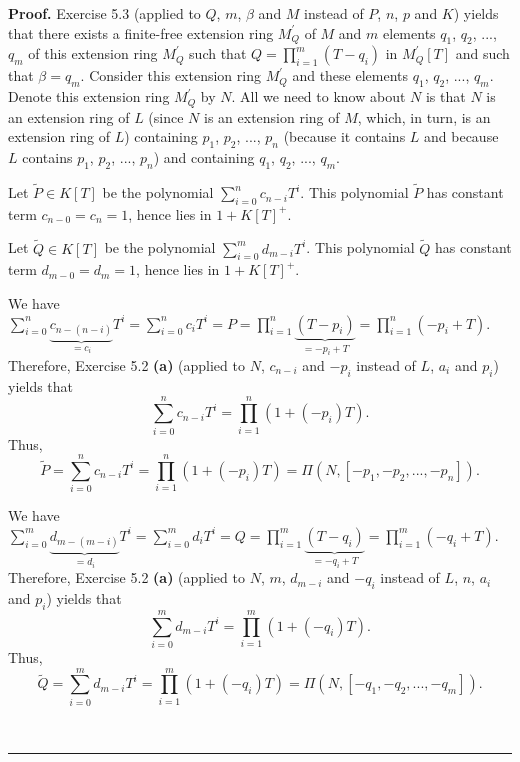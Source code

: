\documentclass[numbers=enddot,12pt,final,onecolumn,notitlepage]{scrartcl}%
\newenvironment{proof}[1][Proof]{\noindent\textbf{#1.} }{\ \rule{0.5em}{0.5em}}
\begin{document}
\begin{proof}
Exercise 5.3 (applied to $Q$, $m$, $\beta$ and $M$ instead of $P$, $n$, $p$
and $K$) yields that there exists a finite-free extension ring $M_{Q}^{\prime
}$ of $M$ and $m$ elements $q_{1}$, $q_{2}$, $...$, $q_{m}$ of this extension
ring $M_{Q}^{\prime}$ such that $Q=\prod\limits_{i=1}^{m}\left(
T-q_{i}\right)  $ in $M_{Q}^{\prime}\left[  T\right]  $ and such that
$\beta=q_{m}$. Consider this extension ring $M_{Q}^{\prime}$ and these
elements $q_{1}$, $q_{2}$, $...$, $q_{m}$. Denote this extension ring
$M_{Q}^{\prime}$ by $N$. All we need to know about $N$ is that $N$ is an
extension ring of $L$ (since $N$ is an extension ring of $M$, which, in turn,
is an extension ring of $L$) containing $p_{1}$, $p_{2}$, $...$, $p_{n}$
(because it contains $L$ and because $L$ contains $p_{1}$, $p_{2}$, $...$,
$p_{n}$) and containing $q_{1}$, $q_{2}$, $...$, $q_{m}$.

Let $\widetilde{P}\in K\left[  T\right]  $ be the polynomial $\sum
\limits_{i=0}^{n}c_{n-i}T^{i}$. This polynomial $\widetilde{P}$ has constant
term $c_{n-0}=c_{n}=1$, hence lies in $1+K\left[  T\right]  ^{+}$.

Let $\widetilde{Q}\in K\left[  T\right]  $ be the polynomial $\sum
\limits_{i=0}^{m}d_{m-i}T^{i}$. This polynomial $\widetilde{Q}$ has constant
term $d_{m-0}=d_{m}=1$, hence lies in $1+K\left[  T\right]  ^{+}$.

We have $\sum\limits_{i=0}^{n}\underbrace{c_{n-\left(  n-i\right)  }}_{=c_{i}%
}T^{i}=\sum\limits_{i=0}^{n}c_{i}T^{i}=P=\prod\limits_{i=1}^{n}%
\underbrace{\left(  T-p_{i}\right)  }_{=-p_{i}+T}=\prod\limits_{i=1}%
^{n}\left(  -p_{i}+T\right)  $. Therefore, Exercise 5.2 \textbf{(a)} (applied
to $N$, $c_{n-i}$ and $-p_{i}$ instead of $L$, $a_{i}$ and $p_{i}$) yields
that%
\[
\sum\limits_{i=0}^{n}c_{n-i}T^{i}=\prod\limits_{i=1}^{n}\left(  1+\left(
-p_{i}\right)  T\right)  .
\]
Thus,%
\[
\widetilde{P}=\sum\limits_{i=0}^{n}c_{n-i}T^{i}=\prod\limits_{i=1}^{n}\left(
1+\left(  -p_{i}\right)  T\right)  =\Pi\left(  N,\left[  -p_{1},-p_{2}%
,...,-p_{n}\right]  \right)  .
\]


We have $\sum\limits_{i=0}^{m}\underbrace{d_{m-\left(  m-i\right)  }}_{=d_{i}%
}T^{i}=\sum\limits_{i=0}^{m}d_{i}T^{i}=Q=\prod\limits_{i=1}^{m}%
\underbrace{\left(  T-q_{i}\right)  }_{=-q_{i}+T}=\prod\limits_{i=1}%
^{m}\left(  -q_{i}+T\right)  $. Therefore, Exercise 5.2 \textbf{(a)} (applied
to $N$, $m$, $d_{m-i}$ and $-q_{i}$ instead of $L$, $n$, $a_{i}$ and $p_{i}$)
yields that%
\[
\sum\limits_{i=0}^{m}d_{m-i}T^{i}=\prod\limits_{i=1}^{m}\left(  1+\left(
-q_{i}\right)  T\right)  .
\]
Thus,%
\[
\widetilde{Q}=\sum\limits_{i=0}^{m}d_{m-i}T^{i}=\prod\limits_{i=1}^{m}\left(
1+\left(  -q_{i}\right)  T\right)  =\Pi\left(  N,\left[  -q_{1},-q_{2}%
,...,-q_{m}\right]  \right)  .
\]



\end{proof}
\end{document}
